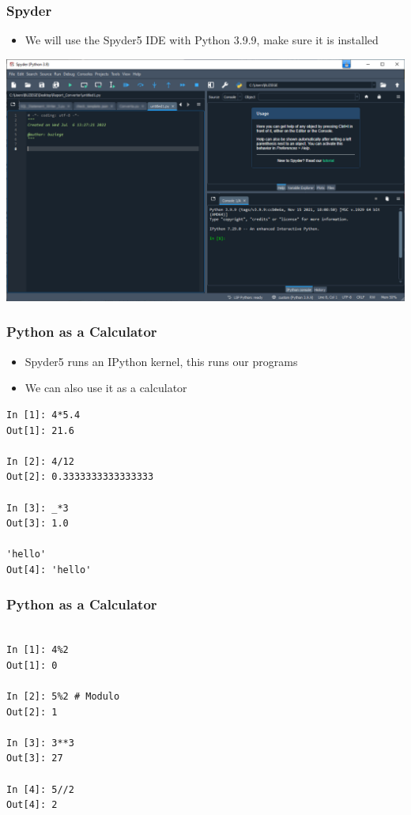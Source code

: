 \documentclass[ngerman]{beamer}
\begin{document}
\begin{frame}
\frametitle{Spyder}

\begin{itemize}
	\item We will use the Spyder5 IDE with Python 3.9.9, make sure it is installed
\end{itemize}

\begin{center}
\includegraphics[width=\textwidth]{Pictures/Spyder5}
\end{center}

\end{frame}

\begin{frame}[fragile]
\frametitle{Python as a Calculator}

\begin{itemize}
\item Spyder5 runs an IPython kernel, this runs our programs
\item We can also use it as a calculator
\end{itemize}

\begin{lstlisting}[style=Python]
In [1]: 4*5.4
Out[1]: 21.6

In [2]: 4/12
Out[2]: 0.3333333333333333

In [3]: _*3
Out[3]: 1.0

'hello'
Out[4]: 'hello'
\end{lstlisting}

\end{frame}


\begin{frame}[fragile]
\frametitle{Python as a Calculator}

\begin{lstlisting}[style=Python]

In [1]: 4%2
Out[1]: 0

In [2]: 5%2 # Modulo
Out[2]: 1

In [3]: 3**3
Out[3]: 27

In [4]: 5//2
Out[4]: 2
\end{lstlisting}

\end{frame}
\end{document}
